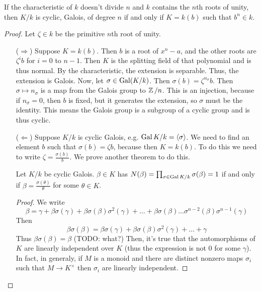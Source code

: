 \begin{theorem}
    If the characteristic of $k$ doesn't divide $n$ and $k$
    contains the $n$th roots of unity,
    then $K/k$ is cyclic, Galois, of degree $n$
    if and only if $K = k(b)$ such that $b^n \in k$.
    \begin{proof}
        Let $\zeta \in k$ be the primitive $n$th root of unity.
        \begin{itemize}
            \item [($\Rightarrow$)] Suppose $K = k(b)$. Then $b$ is a root of $x^n - a$,
            and the other roots are $\zeta^i b$ for $i = 0$ to $n - 1$. Then $K$ is the splitting
            field of that polynomial and is thus normal. By the characteristic, the extension is separable. Thus, 
            the extension is Galois. Now, let $\sigma \in \operatorname{Gal}(K/k)$. Then 
            $\sigma(b) = \zeta^{n_{\sigma}} b$. Then $\sigma \mapsto n_{\sigma}$
            is a map from the Galois group to $\operatorname{\mathbb{Z}}/n$. This is an injection, because if $n_{\sigma} = 0$,
            then $b$ is fixed, but it generates the extension, so $\sigma$ must be the identity.
            This means the Galois group is a subgroup of a cyclic group and is thus cyclic.
            \item [($\Leftarrow$)] Suppose $K/k$ is cyclic Galois, e.g. $\operatorname{Gal} K/k = \langle \sigma \rangle$.
            We need to find an element $b$ such that $\sigma(b) = \zeta b$, because then $K = k(b)$.
            To do this we need to write $\zeta = \frac{\sigma(b)}{b}$. We prove another theorem to do this.
            \begin{theorem}
                Let $K/k$ be cyclic Galois.
                $\beta \in K$ has $N(\beta) = \prod_{\sigma \in \operatorname{Gal} K/k} \sigma(\beta) = 1$
                if and only if $\beta = \frac{\sigma(\theta)}{\theta}$ for some $\theta \in K$.
                \begin{proof}
                    We write 
                    \[ \beta = \gamma + \beta \sigma(\gamma) + \beta \sigma(\beta) \sigma^2(\gamma) + \dots + \beta \sigma(\beta) \dots \sigma^{n - 2}(\beta) \sigma^{n - 1}(\gamma)\]
                    Then
                    \[ \beta \sigma(\beta) = \beta \sigma(\gamma) + \beta \sigma(\beta) \sigma^2(\gamma) + \dots +\gamma\]
                    Thus $\beta \sigma(\beta) = \beta$ (TODO: what?)
                    Then, it's true that the automorphisms of $K$ are linearly independent over $K$ (thus the expression is not $0$ for some $\gamma$).
                    In fact, in generaly, if $M$ is a monoid and there are distinct nonzero maps $\sigma_i$ such that $M \to K^{\times}$ then $\sigma_i$ are linearly independent.

\end{proof}
\end{theorem}
\end{itemize}
\end{proof}
\end{theorem}
